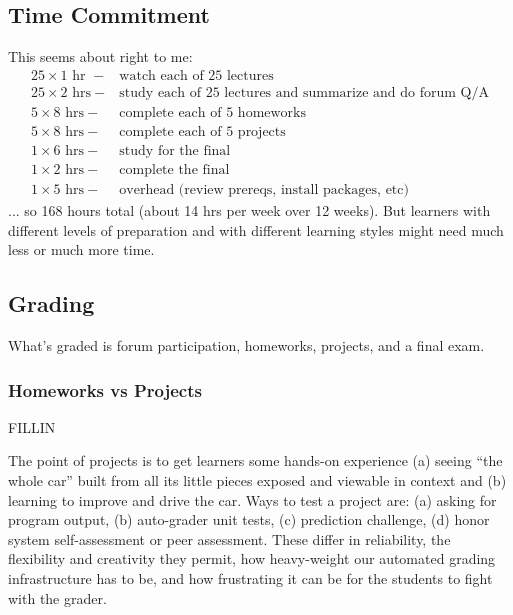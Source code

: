 \documentclass[12pt]{article}
\begin{document}
    \subsection*{Time Commitment}
      This seems about right to me:
      \begin{align*}
           25 \times \text{1 hr } -& \text{watch each of 25 lectures}
        \\ 25 \times \text{2 hrs} -& \text{study each of 25 lectures and summarize and do forum Q/A}
        \\  5 \times \text{8 hrs} -& \text{complete each of 5 homeworks}
        \\  5 \times \text{8 hrs} -& \text{complete each of 5 projects}
        \\  1 \times \text{6 hrs} -& \text{study for the final}
        \\  1 \times \text{2 hrs} -& \text{complete the final}
        \\  1 \times \text{5 hrs} -& \text{overhead (review prereqs, install packages, etc)}
      \end{align*}
      ... so 168 hours total (about 14 hrs per week over 12 weeks).
      But learners with different levels of preparation and with different
      learning styles might need much less or much more time.

    \subsection*{Grading}
      What's graded is forum participation, homeworks, projects, and a final
      exam.

      \subsubsection*{Homeworks vs Projects}
        FILLIN

        The point of projects is to get learners some hands-on experience (a)
        seeing ``the whole car'' built from all its little pieces exposed and
        viewable in context and (b) learning to improve and drive
        the car.  Ways to test a project are:
        (a) asking for program output,
        (b) auto-grader unit tests,
        (c) prediction challenge,
        (d) honor system self-assessment or peer assessment.
        These differ in reliability, the flexibility and creativity they
        permit, how heavy-weight our automated grading infrastructure has to
        be, and how frustrating it can be for the students to fight with the
        grader.
\end{document}
